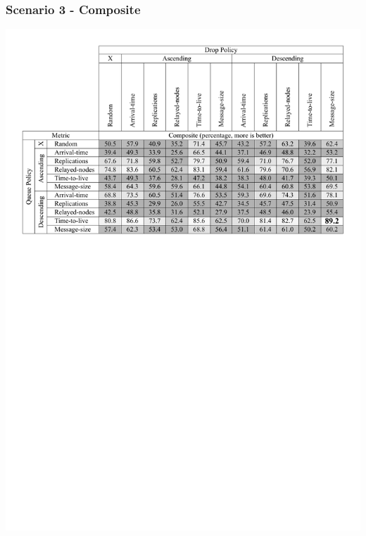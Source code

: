 \begin{frame}
  \frametitle{Scenario 3 - Composite}
  \begin{center}
   \includegraphics[width=1.0\textwidth]{fig/tables/scenario3_part4.pdf}
  \end{center}
\end{frame}




